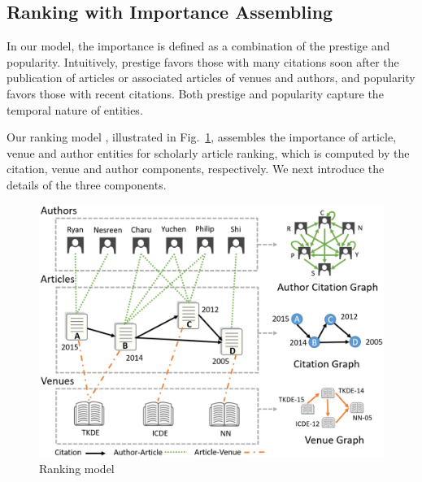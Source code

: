 \subsection{Ranking with Importance Assembling}
\label{subsec-ensemble}


In our model, the importance is defined as a combination of the prestige and popularity. Intuitively, prestige favors those with many citations soon after the publication of articles or associated articles of venues and authors, and popularity favors those with recent citations. Both prestige and popularity capture the temporal nature of entities. %

Our ranking model \ensemblerank,  illustrated in Fig.~\ref{fig-rankmodel}, assembles the importance of article, venue and author entities for scholarly article ranking, which is computed by the citation, venue and author components, respectively.
%
We next introduce the details of the three components.

\begin{figure}[tb!]
\centering
\includegraphics[scale=0.35]{fig/example-graph.eps}
\vspace{-1ex}
\caption{\small Ranking model \ensemblerank} \label{fig-rankmodel}
\vspace{-3ex}
\end{figure}

